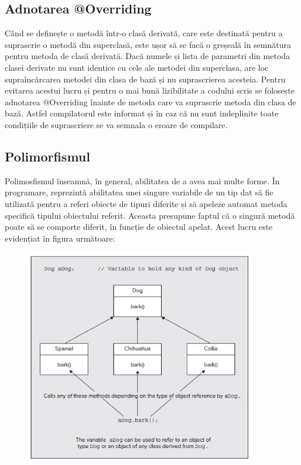 \subsection{Adnotarea @Overriding}
Când se definește o metodă într-o clasă derivată, care este destinată pentru a suprascrie o metodă din superclasă, este ușor să se facă o greșeală în semnătura pentru metoda de clasă derivată. Dacă numele și lista de parametri din metoda clasei derivate nu sunt identice cu cele ale metodei din superclasa, are loc supraîncărcarea metodei din clasa de bază și nu suprascrierea acesteia. Pentru evitarea acestui lucru și pentru o mai bună lizibilitate a codului scris se folosește adnotarea @Overriding înainte de metoda care va suprascrie metoda din clasa de bază. Astfel compilatorul este informat și în caz că nu sunt indeplinite toate condițiile de suprascriere se va semnala o eroare de compilare.\cite{14} \newline

\subsection{Polimorfismul}
Polimosfismul înseamnă, în general, abilitatea de a avea mai multe forme. În programare, reprezintă abilitatea unei singure variabile de un tip dat să fie utilizată pentru a referi obiecte de tipuri diferite și să apeleze automat metoda specifică tipului obiectului referit. Aceasta presupune faptul că o singură metodă poate să se comporte diferit, în funcție de obiectul apelat.\newline
Acest lucru este evidențiat în figura următoare:\cite{14} 
\begin{figure}[!hp]
\centering
\includegraphics[width=0.9\textwidth]
{imagini/polimorfism.eps}
\end{figure}
